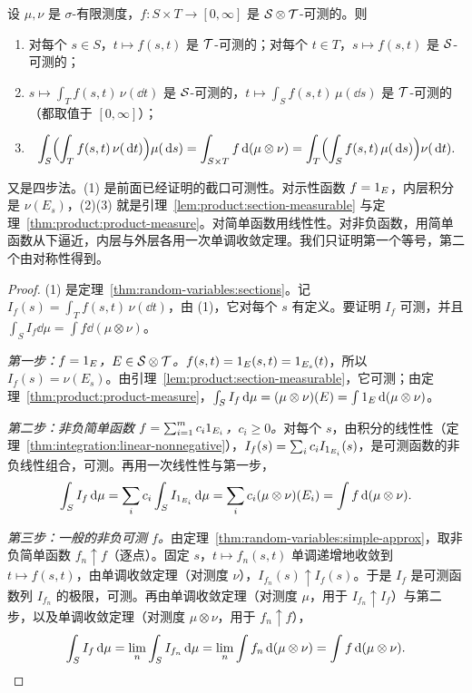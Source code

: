 \begin{theorem}[Tonelli 定理]\label{thm:product:tonelli}
设 $\mu,\nu$ 是 $\sigma$-有限测度，$f:S\times T\to[0,\infty]$ 是 $\mathcal{S}\otimes\mathcal{T}$-可测的。则
\begin{enumerate}
\item 对每个 $s\in S$，$t\mapsto f(s,t)$ 是 $\mathcal{T}$-可测的；对每个 $t\in T$，$s\mapsto f(s,t)$ 是 $\mathcal{S}$-可测的；
\item $s\mapsto\int_Tf(s,t)\,\nu(\dd t)$ 是 $\mathcal{S}$-可测的，$t\mapsto\int_Sf(s,t)\,\mu(\dd s)$ 是 $\mathcal{T}$-可测的（都取值于 $[0,\infty]$）；
\item
\[
\int_S\Bigl(\int_Tf(s,t)\,\nu(\,\mathrm{d} t)\Bigr)\mu(\,\mathrm{d} s)=\int_{S\times T}f\,\mathrm{d}(\mu\otimes\nu)=\int_T\Bigl(\int_Sf(s,t)\,\mu(\,\mathrm{d} s)\Bigr)\nu(\,\mathrm{d} t).
\]
\end{enumerate}
\end{theorem}

\begin{remark}[证明思路]
又是四步法。(1) 是前面已经证明的截口可测性。对示性函数 $f=1_E$，内层积分是 $\nu(E_s)$，(2)(3) 就是引理~\ref{lem:product:section-measurable} 与定理~\ref{thm:product:product-measure}。对简单函数用线性性。对非负函数，用简单函数从下逼近，内层与外层各用一次单调收敛定理。我们只证明第一个等号，第二个由对称性得到。
\end{remark}

\begin{proof}
(1) 是定理~\ref{thm:random-variables:sections}。记 $I_f(s)=\int_Tf(s,t)\,\nu(\dd t)$，由 (1)，它对每个 $s$ 有定义。要证明 $I_f$ 可测，并且 $\int_SI_f\dd\mu=\int f\dd(\mu\otimes\nu)$。

\emph{第一步：$f=1_E$，$E\in\mathcal{S}\otimes\mathcal{T}$。}$f(s,t)=1_E(s,t)=1_{E_s}(t)$，所以 $I_f(s)=\nu(E_s)$。由引理~\ref{lem:product:section-measurable}，它可测；由定理~\ref{thm:product:product-measure}，$\int_SI_f\,\mathrm{d}\mu=(\mu\otimes\nu)(E)=\int1_E\,\mathrm{d}(\mu\otimes\nu)$。

\emph{第二步：非负简单函数 $f=\sum_{i=1}^mc_i1_{E_i}$，$c_i\geqslant0$。}对每个 $s$，由积分的线性性（定理~\ref{thm:integration:linear-nonnegative}），$I_f(s)=\sum_ic_iI_{1_{E_i}}(s)$，是可测函数的非负线性组合，可测。再用一次线性性与第一步，
\[
\int_SI_f\,\mathrm{d}\mu=\sum_ic_i\int_SI_{1_{E_i}}\,\mathrm{d}\mu=\sum_ic_i(\mu\otimes\nu)(E_i)=\int f\,\mathrm{d}(\mu\otimes\nu).
\]

\emph{第三步：一般的非负可测 $f$。}由定理~\ref{thm:random-variables:simple-approx}，取非负简单函数 $f_n\uparrow f$（逐点）。固定 $s$，$t\mapsto f_n(s,t)$ 单调递增地收敛到 $t\mapsto f(s,t)$，由单调收敛定理（对测度 $\nu$），$I_{f_n}(s)\uparrow I_f(s)$。于是 $I_f$ 是可测函数列 $I_{f_n}$ 的极限，可测。再由单调收敛定理（对测度 $\mu$，用于 $I_{f_n}\uparrow I_f$）与第二步，以及单调收敛定理（对测度 $\mu\otimes\nu$，用于 $f_n\uparrow f$），
\[
\int_SI_f\,\mathrm{d}\mu=\lim_n\int_SI_{f_n}\,\mathrm{d}\mu=\lim_n\int f_n\,\mathrm{d}(\mu\otimes\nu)=\int f\,\mathrm{d}(\mu\otimes\nu).\qedhere
\]
\end{proof}

